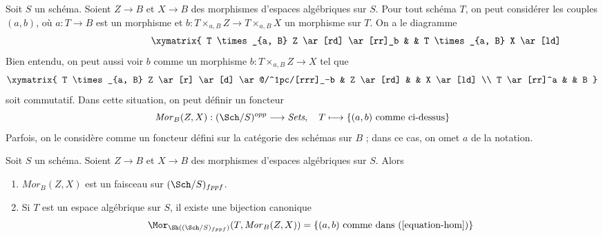 \medskip\noindent
Soit $S$ un schéma. Soient $Z \to B$ et $X \to B$ des morphismes
d'espaces algébriques sur $S$. Pour tout schéma $T$, on peut considérer les couples
$(a, b)$, où $a : T \to B$
est un morphisme et $b : T \times_{a, B} Z \to T \times_{a, B} X$
un morphisme sur $T$. On a le diagramme
\begin{equation}
\label{equation-hom}
\vcenter{
\xymatrix{
T \times_{a, B} Z \ar[rd] \ar[rr]_b & &
T \times_{a, B} X \ar[ld] & Z \ar[rd] & & X \ar[ld] \\
& T \ar[rrr]^a & & & B
}
}
\end{equation}
Bien entendu, on peut aussi voir $b$ comme un morphisme
$b : T \times_{a, B} Z \to X$ tel que
$$
\xymatrix{
T \times_{a, B} Z \ar[r] \ar[d] \ar@/^1pc/[rrr]_-b &
Z \ar[rd] & & X \ar[ld] \\
T \ar[rr]^a & & B
}
$$
soit commutatif. Dans cette situation, on peut définir un foncteur
\begin{equation}
\label{equation-hom-functor}
\mathit{Mor}_B(Z, X) : (\Sch/S)^{opp} \longrightarrow \textit{Sets},
\quad
T \longmapsto \{(a, b)\text{ comme ci-dessus}\}
\end{equation}
Parfois, on le considère comme un foncteur défini sur la catégorie
des schémas sur $B$ ; dans ce cas, on omet $a$ de la notation.

\begin{lemma}
\label{lemma-hom-functor-sheaf}
Soit $S$ un schéma. Soient $Z \to B$ et $X \to B$ des morphismes
d'espaces algébriques sur $S$. Alors
\begin{enumerate}
\item $\mathit{Mor}_B(Z, X)$ est un faisceau sur
$(\Sch/S)_{fppf}$.
\item Si $T$ est un espace algébrique sur $S$, il existe une
bijection canonique
$$
\Mor_{\Sh((\Sch/S)_{fppf})}(T, \mathit{Mor}_B(Z, X))
=
\{(a, b)\text{ comme dans }(\ref{equation-hom})\}
$$
\end{enumerate}
\end{lemma}

